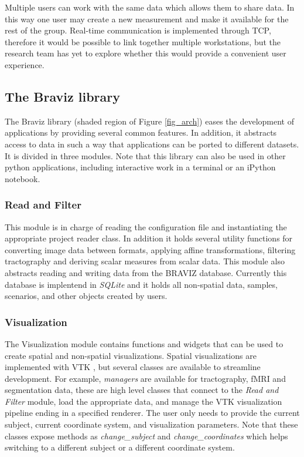 \documentclass{frontiersHLTH}
\begin{document}
Multiple users can work with the same data  which allows them to share data. In this way one user may create a new measurement and make it available for the rest of the group. Real-time communication is implemented through TCP, therefore it would be possible to link together multiple workstations, but the research team has yet to explore whether this would provide a convenient user experience.

\subsection{The Braviz library}

The Braviz library (shaded region of Figure \ref{fig_arch}) eases the development of applications by providing several common features. In addition, it abstracts access to data in such a way that applications can be ported to different datasets. It is divided in three modules. Note that this library can also be used in other python applications, including interactive work in a terminal or an iPython notebook.

\subsubsection{Read and Filter}

This module is in charge of reading the configuration file and instantiating the appropriate project reader class. In addition it holds several utility functions for converting image data between formats, applying affine transformations, filtering tractography and deriving scalar measures from scalar data. This module also abstracts reading and writing data from the BRAVIZ database. Currently this database is implentend in \emph{SQLite} \cite{hipp_sqlite_2015} and it holds all non-spatial data, samples, scenarios, and other objects created by users.

\subsubsection{Visualization}

The Visualization module contains functions and widgets that can be used to create spatial and non-spatial visualizations. Spatial visualizations are implemented with VTK \cite{schroeder_design_1996} , but several classes are available to streamline development. For example, \emph{managers} are available for tractography, fMRI and segmentation data, these are high level classes that connect to the \emph{Read and Filter} module, load the appropriate data, and manage the VTK visualization pipeline ending in a specified renderer. The user only needs to provide the current subject, current coordinate system, and visualization parameters. Note that these classes expose methods as \emph{change\_subject} and \emph{change\_coordinates} which helps switching to a different subject or a different coordinate system.
\end{document}
